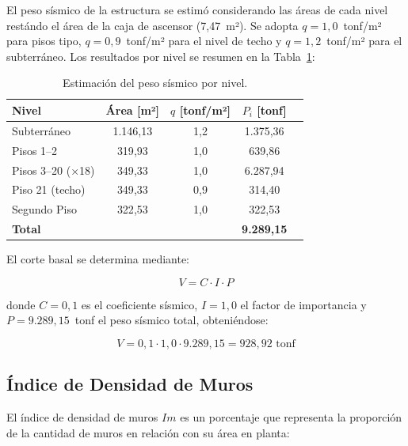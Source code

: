 El peso sísmico de la estructura se estimó considerando las áreas de cada nivel restándo el área de la caja de ascensor (7{,}47~m²). Se adopta $q = 1{,}0$~tonf/m² para pisos 
tipo, $q = 0{,}9$~tonf/m² para el nivel de techo y $q = 1{,}2$~tonf/m² 
para el subterráneo. Los resultados por nivel se resumen en la 
Tabla~\ref{tab:peso_sismico}:

\begin{table}[H]
    \centering
    \begin{tabular}{lcccc}
        \toprule
        \textbf{Nivel} & \textbf{Área [m²]} & 
        $q$ \textbf{[tonf/m²]} & 
        $P_i$ \textbf{[tonf]} \\
        \midrule
        Subterráneo        & 1{.}146{,}13 & 1{,}2 & 1{.}375{,}36 \\
        Pisos 1--2         & 319{,}93     & 1{,}0 &   639{,}86   \\
        Pisos 3--20 (×18)  & 349{,}33     & 1{,}0 & 6{.}287{,}94 \\
        Piso 21 (techo)    & 349{,}33     & 0{,}9 &   314{,}40   \\
        Segundo Piso       & 322{,}53     & 1{,}0 &   322{,}53   \\
        \midrule
        \textbf{Total}     &              &       & \textbf{9{.}289{,}15} \\
        \bottomrule
    \end{tabular}
    \caption{Estimación del peso sísmico por nivel.}
    \label{tab:peso_sismico}
\end{table}

El corte basal se determina mediante:

\begin{equation}
    V = C \cdot I \cdot P
    \label{eq:corte_basal}
\end{equation}

donde $C = 0{,}1$ es el coeficiente sísmico, $I = 1{,}0$ el factor de 
importancia y $P = 9{.}289{,}15$~tonf el peso sísmico total, obteniéndose:

\[
    V = 0{,}1 \cdot 1{,}0 \cdot 9{.}289{,}15 = 928{,}92 \text{ tonf}
\]

\subsection{Índice de Densidad de Muros}

El índice de densidad de muros $Im$ es un porcentaje que representa la 
proporción de la cantidad de muros en relación con su área en planta:

